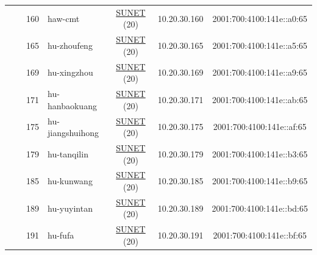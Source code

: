 \begin{small}
\begin{center}
\begin{longtable}{|c|c|c|c|c|c|c|c|}
  &  & \tiny{160} & \multicolumn{1}{|l|}{\tiny{haw-cmt}} & \multicolumn{2}{|c|}{\tiny{\href{http://www.sunet.se}{SUNET} (20)}} & \tiny{10.20.30.160} & \tiny{2001:700:4100:141e::a0:65} \\* \cline{3-3}\cline{4-4}\cline{5-5}\cline{6-6}\cline{7-7}\cline{8-8}
  &  & \tiny{165} & \multicolumn{1}{|l|}{\tiny{hu-zhoufeng}} & \multicolumn{2}{|c|}{\tiny{\href{http://www.sunet.se}{SUNET} (20)}} & \tiny{10.20.30.165} & \tiny{2001:700:4100:141e::a5:65} \\* \cline{3-3}\cline{4-4}\cline{5-5}\cline{6-6}\cline{7-7}\cline{8-8}
  &  & \tiny{169} & \multicolumn{1}{|l|}{\tiny{hu-xingzhou}} & \multicolumn{2}{|c|}{\tiny{\href{http://www.sunet.se}{SUNET} (20)}} & \tiny{10.20.30.169} & \tiny{2001:700:4100:141e::a9:65} \\* \cline{3-3}\cline{4-4}\cline{5-5}\cline{6-6}\cline{7-7}\cline{8-8}
  &  & \tiny{171} & \multicolumn{1}{|l|}{\tiny{hu-hanbaokuang}} & \multicolumn{2}{|c|}{\tiny{\href{http://www.sunet.se}{SUNET} (20)}} & \tiny{10.20.30.171} & \tiny{2001:700:4100:141e::ab:65} \\* \cline{3-3}\cline{4-4}\cline{5-5}\cline{6-6}\cline{7-7}\cline{8-8}
  &  & \tiny{175} & \multicolumn{1}{|l|}{\tiny{hu-jiangshuihong}} & \multicolumn{2}{|c|}{\tiny{\href{http://www.sunet.se}{SUNET} (20)}} & \tiny{10.20.30.175} & \tiny{2001:700:4100:141e::af:65} \\* \cline{3-3}\cline{4-4}\cline{5-5}\cline{6-6}\cline{7-7}\cline{8-8}
  &  & \tiny{179} & \multicolumn{1}{|l|}{\tiny{hu-tanqilin}} & \multicolumn{2}{|c|}{\tiny{\href{http://www.sunet.se}{SUNET} (20)}} & \tiny{10.20.30.179} & \tiny{2001:700:4100:141e::b3:65} \\* \cline{3-3}\cline{4-4}\cline{5-5}\cline{6-6}\cline{7-7}\cline{8-8}
  &  & \tiny{185} & \multicolumn{1}{|l|}{\tiny{hu-kunwang}} & \multicolumn{2}{|c|}{\tiny{\href{http://www.sunet.se}{SUNET} (20)}} & \tiny{10.20.30.185} & \tiny{2001:700:4100:141e::b9:65} \\* \cline{3-3}\cline{4-4}\cline{5-5}\cline{6-6}\cline{7-7}\cline{8-8}
  &  & \tiny{189} & \multicolumn{1}{|l|}{\tiny{hu-yuyintan}} & \multicolumn{2}{|c|}{\tiny{\href{http://www.sunet.se}{SUNET} (20)}} & \tiny{10.20.30.189} & \tiny{2001:700:4100:141e::bd:65} \\* \cline{3-3}\cline{4-4}\cline{5-5}\cline{6-6}\cline{7-7}\cline{8-8}
  &  & \tiny{191} & \multicolumn{1}{|l|}{\tiny{hu-fufa}} & \multicolumn{2}{|c|}{\tiny{\href{http://www.sunet.se}{SUNET} (20)}} & \tiny{10.20.30.191} & \tiny{2001:700:4100:141e::bf:65} \\ \hline

\end{longtable}
\end{center}
\end{small}
